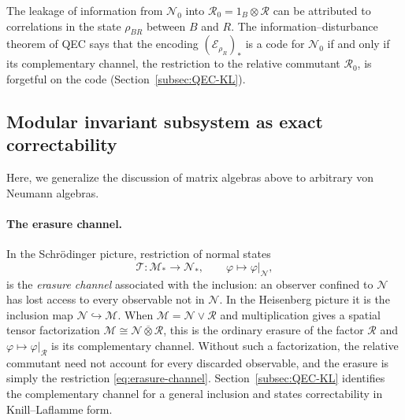 \documentclass[a4paper,11pt]{article}
\theoremstyle{definition}
\newcommand{\mR}{\mathcal{R}}
\newcommand{\mN}{\mathcal{N}}
\newcommand{\mM}{\mathcal{M}}
\newcommand{\mE}{\mathcal{E}}
\begin{document}
The leakage of information from $\mN_0$ into $\mR_0=1_B\otimes \mR$ can be attributed to correlations in the state $\rho_{BR}$ between $B$ and $R$. The information--disturbance theorem of QEC says that the encoding $(\mE_{\rho_R})_*$ is a code for $\mN_0$ if and only if its complementary channel, the restriction to the relative commutant $\mR_0$, is forgetful on the code (Section~\ref{subsec:QEC-KL}).



\subsection{Modular invariant subsystem as exact correctability}\label{subsec:QEC-takesaki}

Here, we generalize the discussion of matrix algebras above to arbitrary von Neumann algebras.

\paragraph{The erasure channel.}
In the Schr\"odinger picture, restriction of normal states
\begin{equation}
 \mathcal T:\mM_*\to\mN_*,\qquad \varphi\mapsto\varphi|_{\mN},
 \label{eq:erasure-channel}
\end{equation}
is the \emph{erasure channel} associated with the inclusion: an observer confined to $\mN$ has lost access to every observable not in $\mN$. In the Heisenberg picture it is the inclusion map $\mN\hookrightarrow\mM$. When $\mM=\mN\vee\mR$ and multiplication gives a spatial tensor factorization $\mM\cong\mN\overline\otimes\mR$, this is the ordinary erasure of the factor $\mR$ and $\varphi\mapsto\varphi|_{\mR}$ is its complementary channel. Without such a factorization, the relative commutant need not account for every discarded observable, and the erasure is simply the restriction \eqref{eq:erasure-channel}. Section~\ref{subsec:QEC-KL} identifies the complementary channel for a general inclusion and states correctability in Knill--Laflamme form.
\end{document}
